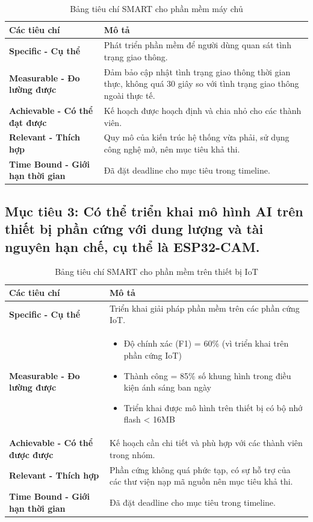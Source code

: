 \begin{table}[h!]
    \centering
    \begin{tabular}{|p{7cm}|p{10cm}|}
    \hline
    \textbf{Các tiêu chí} & \textbf{Mô tả} \\
    \hline
    \textbf{Specific - Cụ thể} & Phát triển phần mềm để người dùng quan sát tình trạng giao thông. \\
    \hline
    \textbf{Measurable - Đo lường được} & Đảm bảo cập nhật tình trạng giao thông thời gian thực, không quá 30 giây so với tình trạng giao thông ngoài thực tế. \\
    \hline
    \textbf{Achievable - Có thể đạt được} & Kế hoạch được hoạch định và chia nhỏ cho các thành viên. \\
    \hline
    \textbf{Relevant - Thích hợp} & Quy mô của kiến trúc hệ thống vừa phải, sử dụng công nghệ mở, nên mục tiêu khả thi. \\
    \hline
    \textbf{Time Bound - Giới hạn thời gian} & Đã đặt deadline cho mục tiêu trong timeline. \\
    \hline
    \end{tabular}
    \caption{Bảng tiêu chí SMART cho phần mềm máy chủ}
\end{table}

\subsection*{Mục tiêu 3: Có thể triển khai mô hình AI trên thiết bị phần cứng với dung lượng và tài nguyên hạn chế, cụ thể là ESP32-CAM.}

\begin{table}[h!]
    \centering
    \begin{tabular}{|p{7cm}|p{10cm}|}
    \hline
    \textbf{Các tiêu chí} & \textbf{Mô tả} \\
    \hline
    \textbf{Specific - Cụ thể} & Triển khai giải pháp phần mềm trên các phần cứng IoT. \\
    \hline
    \textbf{Measurable - Đo lường được} & 
    \begin{itemize}
      \item Độ chính xác (F1) \>= 60\% (vì triển khai trên phần cứng IoT)
      \item Thành công \>= 85\% số khung hình trong điều kiện ánh sáng ban ngày
      \item Triển khai được mô hình trên thiết bị có bộ nhớ flash < 16MB
    \end{itemize}
    \\
    \hline
    \textbf{Achievable - Có thể được được} & Kế hoạch cần chi tiết và phù hợp với các thành viên trong nhóm. \\
    \hline
    \textbf{Relevant - Thích hợp} & Phần cứng không quá phức tạp, có sự hỗ trợ của các thư viện nạp mã nguồn nên mục tiêu khả thi. \\
    \hline
    \textbf{Time Bound - Giới hạn thời gian} & Đã đặt deadline cho mục tiêu trong timeline. \\
    \hline
    \end{tabular}
    \caption{Bảng tiêu chí SMART cho phần mềm trên thiết bị IoT}
\end{table}

